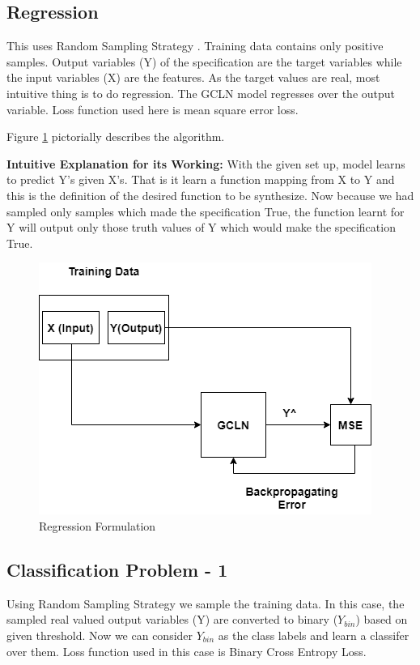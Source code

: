 \subsection{Regression}
This uses Random Sampling Strategy . Training data contains only positive samples. 
Output variables (Y) of the specification are the target variables while the input variables (X) are the features.
As the target values are real, most intuitive thing is to do regression.
The GCLN model regresses over the output variable. Loss function used here is mean square error loss.

Figure \ref{fig:regr} pictorially describes the algorithm.


\noindent\textbf{Intuitive Explanation for its Working: } With the given set up, model learns to predict Y's given X's.
That is it learn a function mapping from X to Y and this is the definition of the desired function to be synthesize. 
Now because we had sampled only samples which made the specification True, the function learnt for Y will output only 
those truth values of Y which would make the specification True.

\begin{figure}
	\centering
    \includegraphics[scale=0.4]{regression.png}
    \caption{Regression Formulation}
    \label{fig:regr}
\end{figure}

\subsection{Classification Problem - 1}
Using Random Sampling Strategy  we sample the training data.
In this case, the sampled real valued output variables (Y) are converted to binary ($Y_{bin}$) based on given threshold. 
Now we can consider $Y_{bin}$ as the class labels and learn a classifer over them. 
Loss function used in this case is Binary Cross Entropy Loss.


